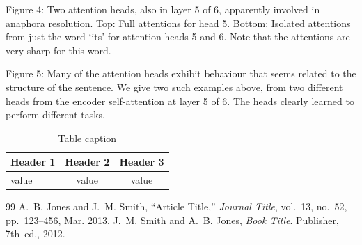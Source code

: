 \documentclass[12pt, a4paper]{article}
\begin{document}
Figure 4: Two attention heads, also in layer 5 of 6, apparently involved in anaphora resolution. Top: Full attentions for head 5. Bottom: Isolated attentions from just the word ‘its’ for attention heads 5 and 6. Note that the attentions are very sharp for this word.

Figure 5: Many of the attention heads exhibit behaviour that seems related to the structure of the sentence. We give two such examples above, from two different heads from the encoder self-attention at layer 5 of 6. The heads clearly learned to perform different tasks.

\begin{table}[H]
\centering
\caption{Table caption}
\begin{tabular}{lcc}
\toprule
Header 1 & Header 2 & Header 3 \\
\midrule
value & value & value \\
\bottomrule
\end{tabular}
\end{table}

\begin{thebibliography}{99}
A.~B. Jones and J.~M. Smith,
``Article Title,''
\textit{Journal Title}, vol.~13, no.~52,
pp.~123--456, Mar. 2013.
J.~M. Smith and A.~B. Jones,
\textit{Book Title}.
Publisher, 7th~ed., 2012.
\end{thebibliography}
\end{document}
